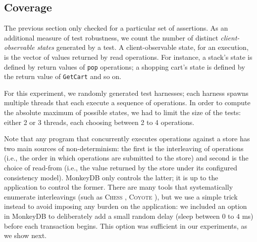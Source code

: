 %	
%		
%		
%		
%		
%		
%		
%		
%		
%	

\subsection{Coverage}
\label{sec:micro-coverage}

The previous section only checked for a particular set of assertions. As an additional measure of
test robustness, we count the number of distinct \textit{client-observable
states} generated by a test. A client-observable state, for an execution, is the vector of values returned by
read operations. For instance, a stack's state is defined by return values of 
\texttt{pop} operations; a shopping cart's state is defined by the return value
of \texttt{GetCart} and so on. 

For this experiment, we randomly generated test harnesses; each harness spawns
multiple threads that each execute a sequence of operations. In order to compute the absolute maximum
of possible states, we had to limit the size of the tests: either 2 or 3
threads, each choosing between 2 to 4 operations. 

Note that any program that concurrently executes operations against a store has
two main sources of non-determinism: the first is the interleaving of operations
(i.e., the order in which operations are submitted to the store) and second is
the choice of read-from (i.e., the value returned by the store under its
configured consistency model). MonkeyDB only controls the latter; it is up to the
application to control the former. There are many tools that systematically enumerate
interleavings (such as \textsc{Chess} \cite{DBLP:conf/pldi/MusuvathiQ08},
\textsc{Coyote} \cite{coyote-web}), but we use a simple trick
instead to avoid imposing any burden on the application: 
we included an option in MonkeyDB to deliberately add a small random
delay (sleep between $0$ to $4$ ms) before each transaction begins. This option 
was sufficient in our experiments, as we show next.

